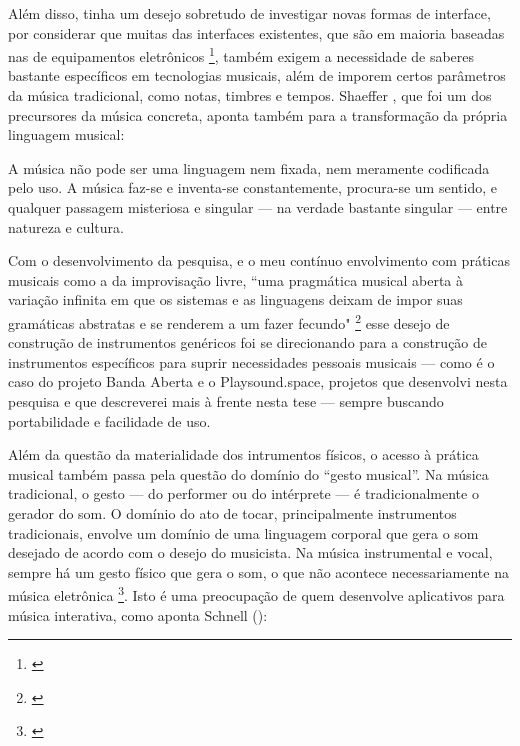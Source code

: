  Além disso, tinha um desejo sobretudo de investigar novas formas de interface, por considerar que muitas das interfaces existentes, que são em maioria baseadas nas de equipamentos eletrônicos \footnote{\cite{Stolfi2016}}, também exigem a necessidade de saberes bastante específicos em tecnologias musicais, além de imporem certos parâmetros da música tradicional, como notas, timbres e tempos. Shaeffer \citeyear{Schaeffer2007}, que foi um dos precursores da música concreta, aponta também para a transformação da própria linguagem musical: 


 \begin{citacao}
A música não pode ser uma linguagem nem fixada, nem meramente codificada pelo uso. A música faz-se e inventa-se constantemente, procura-se um sentido, e qualquer passagem misteriosa e singular — na verdade bastante singular — entre natureza e cultura. \cite{Schaeffer2007}
\end{citacao}

Com o desenvolvimento da pesquisa, e o meu contínuo envolvimento com práticas musicais como a da improvisação livre, ``uma pragmática musical aberta à variação infinita em que os sistemas e as linguagens deixam de impor suas gramáticas abstratas e se renderem a um fazer fecundo" \footnote{\cite[p. 2]{Costa2016}} esse desejo de construção de instrumentos genéricos foi se direcionando para a construção de instrumentos específicos para suprir necessidades pessoais musicais --- como é o caso do projeto Banda Aberta e o Playsound.space, projetos que desenvolvi nesta pesquisa e que descreverei mais à frente nesta tese --- sempre buscando portabilidade e facilidade de uso. 


Além da questão da materialidade dos intrumentos físicos, o acesso à prática musical também passa pela questão do domínio do ``gesto musical''. Na música tradicional, o gesto --- do performer ou do intérprete --- é tradicionalmente o gerador do som. O domínio do ato de tocar, principalmente instrumentos tradicionais, envolve um domínio de uma linguagem corporal que gera o som desejado de acordo com o desejo do musicista. Na música instrumental e vocal, sempre há um gesto físico que gera o som, o que não acontece necessariamente na música eletrônica \footnote{\cite[p. 85]{Smalley1996}}. Isto é uma preocupação de quem desenvolve aplicativos para música interativa, como aponta Schnell (\citeyear{Schnell2013}): 


